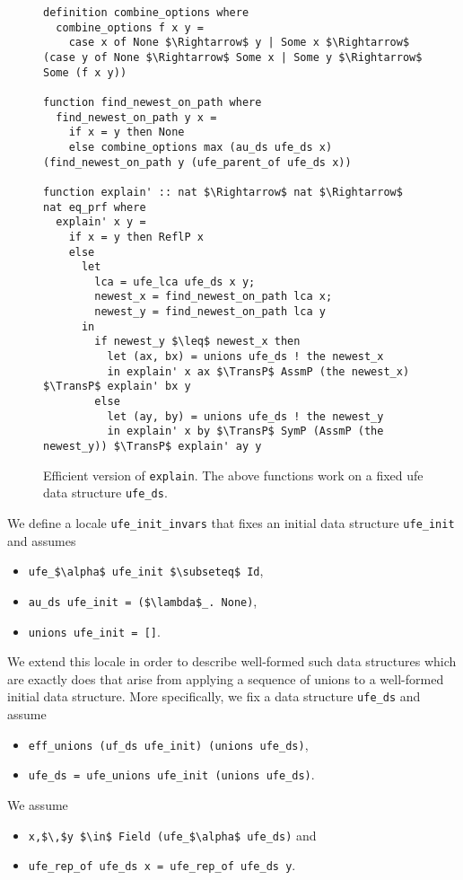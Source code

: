 \documentclass[
  sigplan,
  10pt,
  anonymous,
  review,
  ]{acmart}
\newcommand{\TransP}{\bigtriangledown}
\begin{document}
\begin{figure*}
  \centering
  \begin{lstlisting}
definition combine_options where
  combine_options f x y =
    case x of None $\Rightarrow$ y | Some x $\Rightarrow$ (case y of None $\Rightarrow$ Some x | Some y $\Rightarrow$ Some (f x y))

function find_newest_on_path where
  find_newest_on_path y x =
    if x = y then None
    else combine_options max (au_ds ufe_ds x) (find_newest_on_path y (ufe_parent_of ufe_ds x))

function explain' :: nat $\Rightarrow$ nat $\Rightarrow$ nat eq_prf where
  explain' x y =
    if x = y then ReflP x
    else
      let
        lca = ufe_lca ufe_ds x y;
        newest_x = find_newest_on_path lca x;
        newest_y = find_newest_on_path lca y
      in
        if newest_y $\leq$ newest_x then
          let (ax, bx) = unions ufe_ds ! the newest_x
          in explain' x ax $\TransP$ AssmP (the newest_x) $\TransP$ explain' bx y
        else
          let (ay, by) = unions ufe_ds ! the newest_y
          in explain' x by $\TransP$ SymP (AssmP (the newest_y)) $\TransP$ explain' ay y
  \end{lstlisting}
  \caption{Efficient version of \lstinline|explain|. The above functions work on a fixed \acrshort{ufe} data structure \lstinline|ufe_ds|.}
\end{figure*}

  
We define a locale \lstinline|ufe_init_invars| that fixes an initial data structure \lstinline|ufe_init| and assumes
\begin{itemize}
  \item \lstinline|ufe_$\alpha$ ufe_init $\subseteq$ Id|,
  \item \lstinline|au_ds ufe_init = ($\lambda$_. None)|,
  \item \lstinline|unions ufe_init = []|.
\end{itemize}
We extend this locale in order to describe well-formed such data structures which are exactly does that arise from applying a sequence of unions to a well-formed initial data structure.
More specifically, we fix a data structure \lstinline|ufe_ds| and assume
\begin{itemize}
  \item \lstinline|eff_unions (uf_ds ufe_init) (unions ufe_ds)|,
  \item \lstinline|ufe_ds = ufe_unions ufe_init (unions ufe_ds)|.
\end{itemize}
We assume 
\begin{itemize}
  \item \lstinline|x,$\,$y $\in$ Field (ufe_$\alpha$ ufe_ds)| and
  \item \lstinline|ufe_rep_of ufe_ds x = ufe_rep_of ufe_ds y|.
\end{itemize}
\end{document}

